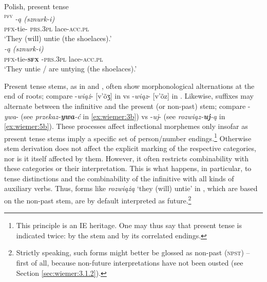 \documentclass[output=paper,colorlinks,citecolor=brown]{langscibook}
\begin{document}
\ea Polish, present tense \label{ex:wiemer:5}\\
    \ea \label{ex:wiemer:5a}
        \textsc{\textsuperscript{pfv}} \textit{-ą} \textit{(sznurk-i)}\\
             \textsc{pfx}-tie- \textsc{prs.3pl} lace-\textsc{acc.pl}\\
        \glt `They (will) untie (the shoelaces).’\\
    
    \ex \label{ex:wiemer:5b}
         {\textit{-ą}} \textit{(sznurk-i)}\\
             {\textsc{pfx}-tie-\textsc{\textbf{sfx}}} {\textsc{-prs.3pl}} {lace-\textsc{acc.pl}}\\
        \glt `They untie / are untying (the shoelaces).’\\
    \z
\z

Present tense stems, as in  and , often show morphonological alternations at the end of roots; compare -\textit{wiąż}- [v'õʒ] in  vs -\textit{wiąz}- [v'õz] in . Likewise, suffixes may alternate between the infinitive and the present (or non-past) stem; compare -\textit{ywa}- (see \textit{przekaz-\textbf{ywa}-ć} in \ref{ex:wiemer:3b}) vs -\textit{uj}- (see \textit{rozwiąz-\textbf{uj}-ą} in \ref{ex:wiemer:5b}). These processes affect inflectional morphemes only insofar as present tense stems imply a specific set of person/number endings.\footnote{This principle is an IE heritage. One may thus say that present tense is indicated twice: by the stem and by its correlated endings.} Otherwise stem derivation does not affect the explicit marking of the respective categories, nor is it itself affected by them. However, it often restricts combinability with these categories or their interpretation. This is what happens, in particular, to tense distinctions and the combinability of the infinitive with all kinds of auxiliary verbs. Thus, forms like \textit{rozwiążą} ‘they (will) untie’ in , which are based on the non-past stem, are by default interpreted as future.\footnote{Strictly speaking, such forms might better be glossed as non-past (\textsc{npst}) – first of all, because non-future interpretations have not been ousted (see Section \ref{sec:wiemer:3.1.2}).}
\end{document}
